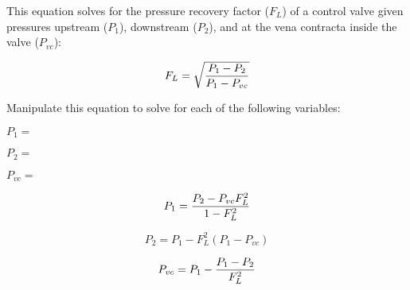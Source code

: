 

This equation solves for the pressure recovery factor ($F_L$) of a control valve given pressures upstream ($P_1$), downstream ($P_2$), and at the vena contracta inside the valve ($P_{vc}$):

$$F_L = \sqrt{{P_1 - P_2} \over {P_1 - P_{vc}}}$$

Manipulate this equation to solve for each of the following variables:

\vskip 10pt

$P_1 =$

\vskip 10pt

$P_2 =$

\vskip 10pt

$P_{vc} =$

\vskip 10pt







$$P_1 = {P_2 - P_{vc}F_L^2 \over 1 - F_L^2}$$

\vskip 20pt

$$P_2 = P_1 - F_L^2 (P_1 - P_{vc})$$

\vskip 20pt

$$P_{vc} = P_1 - {P_1 - P_2 \over F_L^2}$$











